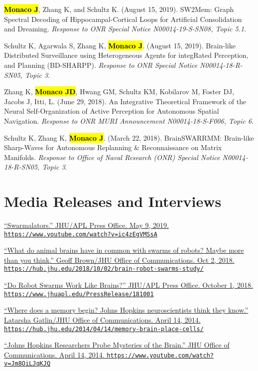 \documentclass[10pt]{article}
\newcommand{\itemtitle}[1]{{\color{hopkinsblue}\ul{#1}}}
\newcommand{\unpubtitle}[1]{{\color{hopkinsblue} #1}}
\newcommand{\joehl}[1]{\hl{\textbf{#1}}}
\newcommand{\aurl}[1]{{\color{dimgray}\texttt{#1}}}
\begin{document}
\begin{description}
  \item \joehl{Monaco J}, Zhang K, and Schultz K. (August 15, 2019).
    \unpubtitle{SW2Mem: Graph Spectral Decoding of Hippocampal-Cortical Loops for
      Artificial Consolidation and Dreaming}. \emph{Response to ONR Special Notice
    N00014-19-S-SN08, Topic 5.1}.
  \item Schultz K, Agarwala S, Zhang K, \joehl{Monaco J}. (August 15, 2019).
    \unpubtitle{Brain-like Distributed Surveillance using Heterogeneous Agents for
      integRated Perception, and Planning (BD-SHARPP)}. \emph{Response to ONR Special
    Notice N00014-18-R-SN05, Topic 3}.
  \item Zhang K, \joehl{Monaco JD}, Hwang GM, Schultz KM, Kobilarov M, Foster
    DJ, Jacobs J, Itti, L. (June 29, 2018). \unpubtitle{An Integrative
      Theoretical Framework of the Neural Self-Organization of Active Perception
      for Autonomous Spatial Navigation}. \emph{Response to ONR MURI Announcement
    N00014-18-S-F006, Topic 6}.
  \item Schultz K, Zhang K, \joehl{Monaco J}. (March 22, 2018).
    \unpubtitle{BrainSWARRMM: Brain-like Sharp-Waves for Autonomous Replanning \&
      Reconnaissance on Matrix Manifolds}. \emph{Response to Office of Naval Research
    (ONR) Special Notice N00014-18-R-SN05, Topic 3}.
\end{description}

\section*{Media Releases and Interviews}

\begin{description}
  \item \href{https://www.youtube.com/watch?v=ic4zEgVMSsA}
    {``\itemtitle{Swarmalators}.'' JHU/APL Press Office. May 9, 2019.
    \aurl{https://www.youtube.com/watch?v=ic4zEgVMSsA}}
  \item \href{https://hub.jhu.edu/2018/10/02/brain-robot-swarms-study/}
    {``\itemtitle{What do animal brains have in common with swarms of robots?
      Maybe more than you think}.'' Geoff Brown/JHU Office of Communications. Oct 2,
    2018. \aurl{https://hub.jhu.edu/2018/10/02/brain-robot-swarms-study/}}
  \item \href{https://www.jhuapl.edu/PressRelease/181001}
    {``\itemtitle{Do Robot Swarms Work Like Brains?}'' JHU/APL Press Office. October 1, 2018.
    \aurl{https://www.jhuapl.edu/PressRelease/181001}}
  \item \href{https://hub.jhu.edu/2014/04/14/memory-brain-place-cells/}
    {``\itemtitle{Where does a memory begin? Johns Hopkins neuroscientists think they
      know}.'' Latarsha Gatlin/JHU Office of Communications. April 14, 2014.
    \aurl{https://hub.jhu.edu/2014/04/14/memory-brain-place-cells/}}
  \item \href{https://www.youtube.com/watch?v=Jm8OiLJqKJQ}
    {``\itemtitle{Johns Hopkins Researchers Probe Mysteries of
      the Brain}.'' JHU Office of Communications. April 14, 2014.
    \aurl{https://www.youtube.com/watch?v=Jm8OiLJqKJQ}}
\end{description}
\end{document}
